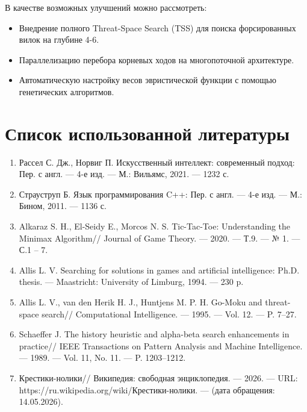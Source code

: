 \documentclass[a4paper,14pt]{extreport}
\begin{document}
В качестве возможных улучшений можно рассмотреть:
\begin{itemize}
    \item Внедрение полного Threat-Space Search (TSS) для поиска форсированных вилок на глубине 4-6.
    \item Параллелизацию перебора корневых ходов на многопоточной архитектуре.
    \item Автоматическую настройку весов эвристической функции с помощью генетических алгоритмов.
\end{itemize}

\chapter*{Список использованной литературы}
\begin{enumerate}
    \item Рассел С. Дж., Норвиг П. Искусственный интеллект: современный подход: Пер. с англ. — 4-е изд. — М.: Вильямс, 2021. — 1232 с.
    \item Страуструп Б. Язык программирования C++: Пер. с англ. — 4-е изд. — М.: Бином, 2011. — 1136 с.
    \item Alkaraz S. H., El-Seidy E., Morcos N. S. Tic-Tac-Toe: Understanding the Minimax Algorithm// Journal of Game Theory. — 2020. — Т.9. — № 1. — С.1 – 7.
    \item Allis L. V. Searching for solutions in games and artificial intelligence: Ph.D. thesis. — Maastricht: University of Limburg, 1994. — 230 p.
    \item Allis L. V., van den Herik H. J., Huntjens M. P. H. Go-Moku and threat-space search// Computational Intelligence. — 1995. — Vol. 12. — P. 7–27.
    \item Schaeffer J. The history heuristic and alpha-beta search enhancements in practice// IEEE Transactions on Pattern Analysis and Machine Intelligence. — 1989. — Vol. 11, No. 11. — P. 1203–1212.
    \item Крестики-нолики// Википедия: свободная энциклопедия. — 2026. — URL: https://ru.wikipedia.org/wiki/Крестики-нолики. — (дата обращения: 14.05.2026).
\end{enumerate}

\appendix
\end{document}
